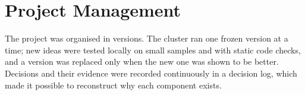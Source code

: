 \section{Project Management}
The project was organised in versions. The cluster ran one frozen version at a time; new ideas were tested locally on small samples and with static code checks, and a version was replaced only when the new one was shown to be better. Decisions and their evidence were recorded continuously in a decision log, which made it possible to reconstruct why each component exists.
